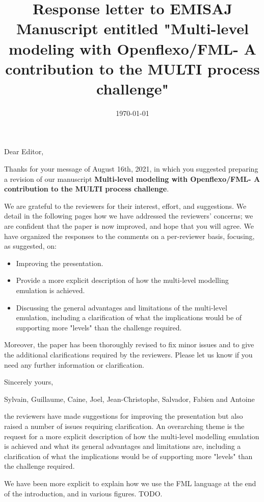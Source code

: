 \documentclass[10pt]{article}
\title{Response letter to EMISAJ Manuscript entitled "Multi-level modeling with Openflexo/FML- A contribution to the MULTI process challenge"}
\date{\today}
\begin{document}
Dear Editor,

\bigskip
Thanks for your message of August 16th, 2021, in which you suggested preparing a revision of our manuscript  \textbf{Multi-level modeling with Openflexo/FML- A contribution to the MULTI process challenge}. 

\bigskip
We are grateful to the reviewers for their interest, effort, and suggestions. We detail in the following pages how we have addressed the reviewers' concerns; we are confident that the paper is now improved, and hope that you will agree. We have organized the responses to the comments on a per-reviewer basis, focusing, as suggested, on: 

\begin{itemize}
\item Improving the presentation.
\item Provide a more explicit description of how the multi-level modelling emulation is achieved.
\item Discussing the general advantages and limitations of the multi-level emulation, including a clarification of what the implications would be of supporting more "levels" than the challenge required.
\end{itemize}

Moreover, the paper has been thoroughly revised to fix minor issues and to give the additional clarifications required by the reviewers. Please let us know if you need any further information or clarification.

\bigskip
Sincerely yours,

\bigskip
Sylvain, Guillaume, Caine, Joel, Jean-Christophe, Salvador, Fabien and Antoine

\pagebreak

\Editor{}

\begin{response}{the reviewers have made suggestions for improving the presentation but also raised a number of issues requiring clarification. An overarching theme is the request for a more explicit description of how the multi-level modelling emulation is achieved and what its general advantages and limitations are, including a clarification of what the implications would be of supporting more "levels" than the challenge required.} 

We have been more explicit to explain how we use the FML language at the end of the introduction, and in various figures. TODO.


\end{response}
\end{document}

